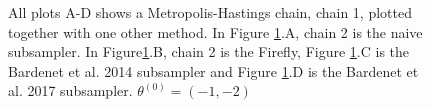 \begin{figure}[H]
    \caption{All plots A-D shows a Metropolis-Hastings chain, chain 1, plotted together with one other method. In Figure \ref{fig:compare_theta1}.A, chain 2 is the naive subsampler. In Figure\ref{fig:compare_theta1}.B, chain 2 is the Firefly, Figure \ref{fig:compare_theta1}.C is the Bardenet et al. 2014 subsampler and Figure \ref{fig:compare_theta1}.D is the Bardenet et al. 2017 subsampler. $\theta
   ^{\left(0\right)} = \left(-1,-2\right)$}%
    \label{fig:compare_theta1}%
\end{figure}

